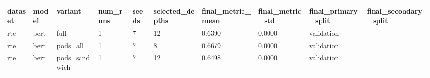 \begin{tabular}{llllllllll}
\hline
dataset & model & variant & num\_runs & seeds & selected\_depths & final\_metric\_mean & final\_metric\_std & final\_primary\_split & final\_secondary\_split \\
\hline
rte & bert & full & 1 & 7 & 12 & 0.6390 & 0.0000 & validation &  \\
rte & bert & pods\_all & 1 & 7 & 8 & 0.6679 & 0.0000 & validation &  \\
rte & bert & pods\_sandwich & 1 & 7 & 12 & 0.6498 & 0.0000 & validation &  \\
\hline
\end{tabular}
